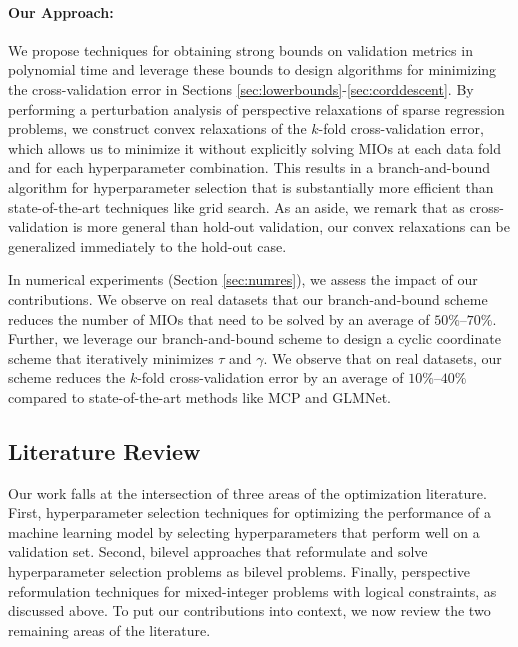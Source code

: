 \documentclass[ijoc,noblindrev]{informs3} %
\begin{document}
\paragraph{Our Approach:} We propose techniques for obtaining strong bounds on validation metrics in polynomial time and leverage these bounds to design algorithms for minimizing the {\color{black}cross-validation} error in Sections \ref{sec:lowerbounds}-\ref{sec:corddescent}. By performing a perturbation analysis of perspective relaxations of sparse regression problems, we construct convex relaxations of the $k$-fold cross-validation error, which allows us to minimize it without explicitly solving MIOs at each data fold and for each hyperparameter combination. This results in a branch-and-bound algorithm for hyperparameter selection that is substantially more efficient than state-of-the-art techniques like grid search. {\color{black}As an aside, we remark that as cross-validation is more general than hold-out validation, our convex relaxations can be generalized immediately to the hold-out case.}

In numerical experiments (Section \ref{sec:numres}), we assess the impact of our contributions. We observe on real datasets that our branch-and-bound scheme reduces the number of MIOs that need to be solved by an average of $50\%$--$70\%$. Further, we leverage our branch-and-bound scheme to design a cyclic coordinate scheme that iteratively minimizes $\tau$ and $\gamma$. We observe that on real datasets, our scheme reduces the $k$-fold cross-validation error by an average of $10\%$--$40\%$ compared to state-of-the-art methods like MCP and GLMNet.




\subsection{Literature Review}
Our work falls at the intersection of three areas of the optimization literature. %
First, hyperparameter selection techniques for optimizing the performance of a machine learning model by selecting hyperparameters that perform well on a validation set. Second, bilevel approaches that reformulate and solve hyperparameter selection problems as bilevel problems. Finally, perspective reformulation techniques for mixed-integer problems with logical constraints{\color{black}, as discussed above.} To put our contributions into context, we now review {\color{black}the two remaining} areas of the literature.
\end{document}
